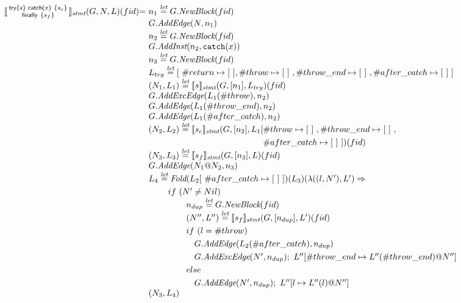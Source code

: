 \[
\begin{array}{l@{}l@{~}l}

\transfun{\irtryfull{s}{x}{s_c}{s_f}}_{\emph{stmt}}(G,N,L)(fid) & = &
	n_1 \letval G.\emph{NewBlock}(fid)\\
	& & G.\emph{AddEdge}(N,n_1)\\
	& & n_2 \letval G.\emph{NewBlock}(fid)\\
	& & G.\emph{AddInst}(n_2,\TT{catch}(x))\\
	& & n_3 \letval G.\emph{NewBlock}(fid)\\
	& & L_{try} \letval [\ \#return \mapsto [\ ], \#throw \mapsto [\ ]\ , \#throw\_end \mapsto [\ ]\ , \#after\_catch \mapsto [\ ]\ ] \\
	& & (N_1,L_1) \letval \transfun{s}_{\emph{stmt}}(G,[n_1],L_{try})(fid)\\
	& & G.\emph{AddExcEdge}(L_1(\#throw),n_2)\\
	& & G.\emph{AddEdge}(L_1(\#throw\_end),n_2)\\
	& & G.\emph{AddEdge}(L_1(\#after\_catch),n_2)\\
	& & (N_2,L_2) \letval \transfun{s_c}_{\emph{stmt}}(G,[n_2],L_1[\#throw \mapsto [\ ]\ , \#throw\_end \mapsto [\ ]\ ,\\
    & & \phantom{(N_2,L_2) \letval \transfun{s_c}_{\emph{stmt}}(G,[n_2],L_1[}	 \#after\_catch \mapsto [\ ]\ ])(fid)\\
	& & (N_3,L_3) \letval \transfun{s_f}_{\emph{stmt}}(G,[n_3],L)(fid)\\
	& & G.\emph{AddEdge}(N_1@N_2,n_3)\\
	& & L_4 \letval \Fold(L_2[\ \#after\_catch \mapsto [\ ]\ ])(L_3)(\lambda((l,N'),L') \Rightarrow\\
	& & \phantom{L_3 \letval}if\ (N' \neq Nil)\\
	& & \phantom{L_3 \letval \Fold} n_{dup} \letval G.\emph{NewBlock}(fid)\\
	& & \phantom{L_3 \letval \Fold} (N'',L'') \letval \transfun{s_f}_{\emph{stmt}}(G,[n_{dup}],L')(fid)\\
	& & \phantom{L_3 \letval \Fold}if\ (l = \#throw)\\	
	& & \phantom{L_3 \letval \Fold if} G.\emph{AddEdge}(L_2(\#after\_catch),n_{dup})\\
	& & \phantom{L_3 \letval \Fold if} G.\emph{AddExcEdge}(N',n_{dup});\ L''[\#throw\_end \mapsto L''(\#throw\_end)@N'']\\
	& & \phantom{L_3 \letval \Fold}else\\
	& & \phantom{L_3 \letval \Fold if} G.\emph{AddEdge}(N',n_{dup});\ L''[l \mapsto L''(l)@N'']\\
	& & (N_3,L_4)\\
	& & \\  
\end{array}
\]
\newpage

